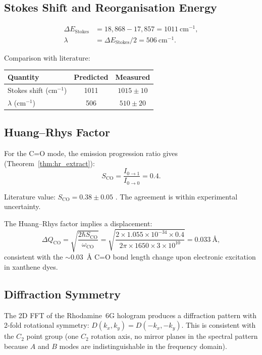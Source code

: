 \documentclass[11pt,a4paper]{article}
\theoremstyle{definition}
\theoremstyle{remark}
\begin{document}
\subsection{Stokes Shift and Reorganisation Energy}

\begin{align}
\Delta E_{\mathrm{Stokes}} &= 18{,}868 - 17{,}857 = 1011~\mathrm{cm}^{-1}, \\
\lambda &= \Delta E_{\mathrm{Stokes}} / 2 = 506~\mathrm{cm}^{-1}.
\end{align}

Comparison with literature:
\begin{center}
\begin{tabular}{lcc}
\toprule
Quantity & Predicted & Measured \\
\midrule
Stokes shift (cm$^{-1}$) & 1011 & $1015 \pm 10$ \\
$\lambda$ (cm$^{-1}$)    & 506  & $510 \pm 20$ \\
\bottomrule
\end{tabular}
\end{center}

\subsection{Huang--Rhys Factor}

For the C=O mode, the emission progression ratio gives (Theorem~\ref{thm:hr_extract}):
\begin{equation}
S_{\mathrm{CO}} = \frac{I_{0\to 1}}{I_{0\to 0}} = 0.4.
\end{equation}

Literature value: $S_{\mathrm{CO}} = 0.38 \pm 0.05$ \citep{kubin1982}. The agreement is within experimental uncertainty.

The Huang--Rhys factor implies a displacement:
\begin{equation}
\Delta Q_{\mathrm{CO}} = \sqrt{\frac{2\hbar S_{\mathrm{CO}}}{\omega_{\mathrm{CO}}}} = \sqrt{\frac{2 \times 1.055 \times 10^{-34} \times 0.4}{2\pi \times 1650 \times 3 \times 10^{10}}} = 0.033~\text{\AA},
\end{equation}
consistent with the $\sim 0.03$~\AA{} C=O bond length change upon electronic excitation in xanthene dyes.

\subsection{Diffraction Symmetry}

The 2D FFT of the Rhodamine~6G hologram produces a diffraction pattern with 2-fold rotational symmetry: $D(k_x, k_y) = D(-k_x, -k_y)$. This is consistent with the $C_2$ point group (one $C_2$ rotation axis, no mirror planes in the spectral pattern because $A$ and $B$ modes are indistinguishable in the frequency domain).
\end{document}
